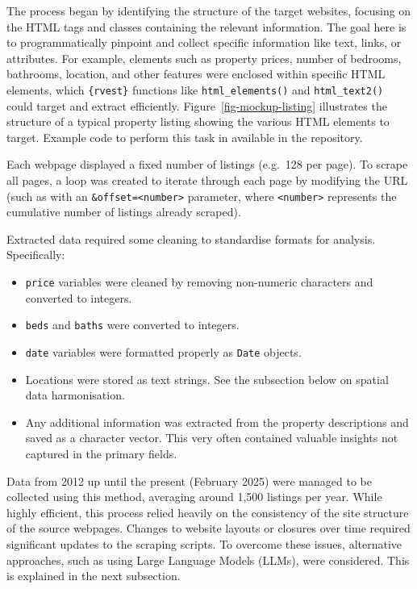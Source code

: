 \documentclass[
  number]{elsarticle}
\providecommand{\tightlist}{%
  \setlength{\itemsep}{0pt}\setlength{\parskip}{0pt}}\usepackage{longtable,booktabs,array}
\begin{document}
The process began by identifying the structure of the target websites,
focusing on the HTML tags and classes containing the relevant
information. The goal here is to programmatically pinpoint and collect
specific information like text, links, or attributes. For example,
elements such as property prices, number of bedrooms, bathrooms,
location, and other features were enclosed within specific HTML
elements, which \texttt{\{rvest\}} functions like
\texttt{html\_elements()} and \texttt{html\_text2()} could target and
extract efficiently. Figure~\ref{fig-mockup-listing} illustrates the
structure of a typical property listing showing the various HTML
elements to target. Example code to perform this task in available in
the repository.

Each webpage displayed a fixed number of listings (e.g.~128 per page).
To scrape all pages, a loop was created to iterate through each page by
modifying the URL (such as with an
\texttt{\&offset=\textless{}number\textgreater{}} parameter, where
\texttt{\textless{}number\textgreater{}} represents the cumulative
number of listings already scraped).

Extracted data required some cleaning to standardise formats for
analysis. Specifically:

\begin{itemize}
\tightlist
\item
  \texttt{price} variables were cleaned by removing non-numeric
  characters and converted to integers.
\item
  \texttt{beds} and \texttt{baths} were converted to integers.
\item
  \texttt{date} variables were formatted properly as \texttt{Date}
  objects.
\item
  Locations were stored as text strings. See the subsection below on
  spatial data harmonisation.
\item
  Any additional information was extracted from the property
  descriptions and saved as a character vector. This very often
  contained valuable insights not captured in the primary fields.
\end{itemize}

Data from 2012 up until the present (February 2025) were managed to be
collected using this method, averaging around 1,500 listings per year.
While highly efficient, this process relied heavily on the consistency
of the site structure of the source webpages. Changes to website layouts
or closures over time required significant updates to the scraping
scripts. To overcome these issues, alternative approaches, such as using
Large Language Models (LLMs), were considered. This is explained in the
next subsection.
\end{document}

